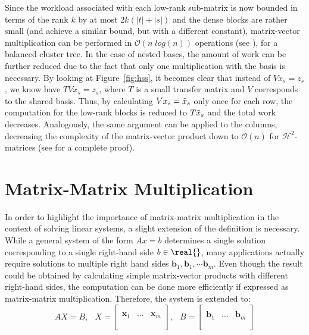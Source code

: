 \noindent Since the workload associated with each low-rank sub-matrix is now bounded in terms of the rank $k$ by at most $2k(|t|+|s|)$ and the dense blocks are rather small (and achieve a similar bound, but with a different constant), matrix-vector multiplication can be performed in $\mathcal{O}(n\;log(n))$ operations (see \cite{bebendorf_hierarchical_2008}), for a balanced cluster tree. In the case of nested bases, the amount of work can be further reduced due to the fact that only one multiplication with the basis is necessary. By looking at Figure~\hyperref[fig:hss]{\ref{fig:hss}}, it becomes clear that instead of $Vx_s = z_s$, we know have $TVx_s = z_s$, where $T$ is a small transfer matrix and $V$ corresponds to the shared basis. Thus, by calculating $Vx_s = \Tilde{x}_s$ only once for each row, the computation for the low-rank blocks is reduced to $T\Tilde{x}_s$ and the total work decreases. Analogously, the same argument can be applied to the columns, decreasing the complexity of the matrix-vector product down to $\mathcal{O}(n)$ for $\mathcal{H}^2$-matrices (see \cite{hackbusch_hierarchical_2015} for a complete proof).

\section{Matrix-Matrix Multiplication}
\label{sec:matrix_matrix}

In order to highlight the importance of matrix-matrix multiplication in the context of solving linear systems, a slight extension of the definition is necessary. While a general system of the form $Ax=b$ determines a single solution corresponding to a single right-hand side $b \in \real{}$, many applications actually require solutions to multiple right hand sides $\bm{b}_1, \bm{b}_1, \cdots \bm{b}_m $. Even though the result could be obtained by calculating simple matrix-vector products with different right-hand sides, the computation can be done more efficiently if expressed as matrix-matrix multiplication. Therefore, the system is extended to:
\begin{equation}
    AX=B\text{, } \;\; X=
    \left[
    \begin{array}{c|c|c}
      & & \\
      \bm{x}_1 &\dots & \bm{x}_m \\
      & & \\
    \end{array}
  \right]\text{, } \;\;B=
    \left[
    \begin{array}{c|c|c}
      & & \\
      \bm{b}_1 &\dots & \bm{b}_m \\
      & & \\
    \end{array}
  \right] 
\end{equation}

